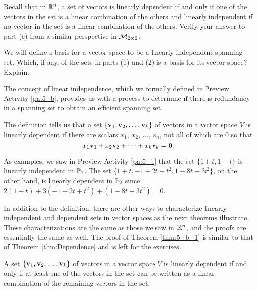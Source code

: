 \begin{pa}
\item Recall that in $\mathbb{R}^n$, a set of vectors is linearly dependent if and only if one of the vectors in the set is a linear combination of the others and linearly independent if no vector in the set is a linear combination of the others. Verify your answer to part (c) from a similar perspective in $\mathcal{M}_{2 \times 2}$.
 	
	\ea
	
	
\item We will define a basis for a vector space to be a linearly independent spanning set. Which, if any, of the sets in parts (1) and (2) is a basis for its vector space? Explain. 

\ee

\end{pa}

\label{sec:lin_indep}

The concept of linear independence, which we formally defined in Preview Activity \ref{pa:5_b}, provides us with a process to determine if there is redundancy in a spanning set to obtain an efficient spanning set. 


The definition tells us that a set $\{\mathbf{v}_1, \mathbf{v}_2, \ldots, \mathbf{v}_k\}$ of vectors in a vector space $V$ is linearly dependent if there are scalars $x_1$, $x_2$, $\ldots$, $x_n$, not all of which are 0 so that
\[x_1 \mathbf{v}_1 + x_2 \mathbf{v}_2 + \cdots + x_k \mathbf{v}_k = \mathbf{0}.\]

As examples, we saw in Preview Activity \ref{pa:5_b} that the set $\{1+t, 1-t\}$ is linearly independent in $\mathbb{P}_1$. The set $\{1+t, -1+2t+t^2, 1-8t-3t^2\}$, on the other hand, is linearly dependent in $\mathbb{P}_2$ since $2(1+t) + 3(-1+2t+t^2) + (1-8t-3t^2) = 0$.  

In addition to the definition, there are other ways to characterize linearly independent and dependent sets in vector spaces as the next theorems illustrate. These characterizations are the same as those we saw in $\mathbb{R}^n$, and the proofs are essentially the same as well. The proof of Theorem \ref{thm:5_b_1} is similar to that of Theorem \ref{thm:Dependence} and is left for the exercises. 

\begin{theorem} \label{thm:5_b_1} A set $\{\mathbf{v}_1, \mathbf{v}_2, \ldots, \mathbf{v}_k\}$ of vectors in a vector space $V$ is linearly dependent if and only if at least one of the vectors in the set can be written as a linear combination of the remaining vectors in the set.
\end{theorem}

